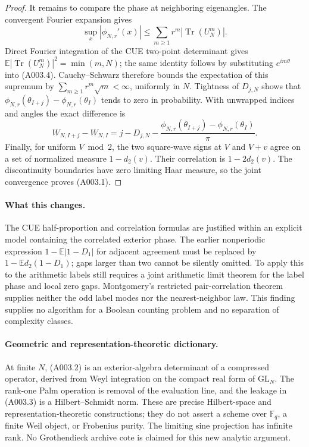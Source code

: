 \begin{proof}
It remains to compare the phase at neighboring eigenangles.  The convergent
Fourier expansion gives
\[
 \sup_x|\phi_{N,r}'(x)|\leq
          \sum_{m\geq1}r^m|\operatorname{Tr}(U_N^m)|.
\]
Direct Fourier integration of the CUE two-point determinant gives
$\mathbb E|\operatorname{Tr}(U_N^m)|^2=\min(m,N)$; the same identity
follows by substituting $e^{im\theta}$ into (A003.4).  Cauchy--Schwarz
therefore bounds the expectation of this supremum by
$\sum_{m\geq1}r^m\sqrt m<\infty$, uniformly in $N$.
Tightness of $D_{j,N}$ shows that
$\phi_{N,r}(\theta_{I+j})-\phi_{N,r}(\theta_I)$ tends to zero in
probability.  With unwrapped indices and angles the exact difference is
\[
 W_{N,I+j}-W_{N,I}=j-D_{j,N}
       -\frac{\phi_{N,r}(\theta_{I+j})-\phi_{N,r}(\theta_I)}{\pi}.
\]
Finally, for uniform $V\bmod2$, the two square-wave signs at $V$ and
$V+v$ agree on a set of normalized measure $1-d_2(v)$.  Their correlation
is $1-2d_2(v)$.  The discontinuity boundaries have zero limiting Haar
measure, so the joint convergence proves (A003.1).
\end{proof}

\paragraph{What this changes.}
The CUE half-proportion and correlation formulas are justified within an
explicit model containing the correlated exterior phase.  The earlier
nonperiodic expression $1-\mathbb E|1-D_1|$ for adjacent agreement must be
replaced by $1-\mathbb E d_2(1-D_1)$; gaps larger than two cannot be silently
omitted.  To apply this to the arithmetic labels still requires a joint
arithmetic limit theorem for the label phase and local zero gaps.
Montgomery's restricted pair-correlation theorem supplies neither the odd
label modes nor the nearest-neighbor law.  This finding supplies no
algorithm for a Boolean counting problem and no separation of complexity
classes.

\paragraph{Geometric and representation-theoretic dictionary.}
At finite $N$, (A003.2) is an exterior-algebra determinant of a compressed
operator, derived from Weyl integration on the compact real form of
$\mathrm{GL}_N$.  The rank-one Palm operation is removal of the evaluation
line, and the leakage in (A003.3) is a Hilbert--Schmidt norm.  These are
precise Hilbert-space and representation-theoretic constructions; they do
not assert a scheme over $\mathbb F_q$, a finite Weil object, or Frobenius
purity.  The limiting sine projection has infinite rank.  No Grothendieck
archive cote is claimed for this new analytic argument.

